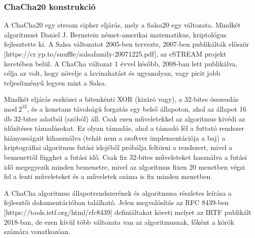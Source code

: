 \documentclass[12pt]{article}
\begin{document}
	\subsubsection{ChaCha20 konstrukció}
	A ChaCha20 egy stream cipher eljárás, mely a Salsa20 egy változata. Mindkét algoritmust Daniel J. Bernstein német-amerikai matematikus, kriptológus fejlesztette ki. A Salsa változatot 2005-ben tervezte, 2007-ben publikálták először [https://cr.yp.to/snuffle/salsafamily-20071225.pdf], az eSTREAM projekt keretében belül. A ChaCha változat 1 évvel később, 2008-ban lett publikálva, célja az volt, hogy növelje a lavinahatást és ugyanolyan, vagy picit jobb teljesítményű legyen mint a Salsa.
	
	Mindkét eljárás eszközei a bitenkénti XOR (kizáró vagy), a 32-bites összeadás $\textrm{mod}\ 2^{32}$, és a konstans távolságú forgatás egy belső állapoton, ahol az állapot 16 db 32-bites adatból (szóból) áll. Csak ezen műveletekkel az algoritmus kivédi az időzítéses támadásokat. Ez olyan támadás, ahol a támadó fél a futtató rendszer hiányosságait kihasználva (tehát nem a szoftver implementációja a baj) a kriptográfiai algoritmus futási idejéből próbálja feltörni a rendszert, mivel a bemenettől függhet a futási idő. Csak fix 32-bites műveleteket használva a futási idő megegyezik minden bemenetre, mivel az algoritmus fixen 20 menetben végzi fel a fenti műveleteket és a műveletek száma is fix minden menetben.
	
	A ChaCha algoritmus állapotrendszerének és algoritmusa részletes leírása a fejlesztői dokumentációban található. Jelen megvalósítás az RFC 8439-ben [https://tools.ietf.org/html/rfc8439] definiáltakat követi melyet az IRTF publikált 2018-ban, de ezen kívül több változata van az algoritmusnak, főként a körök számára vonatkozóan.
	
\end{document}
